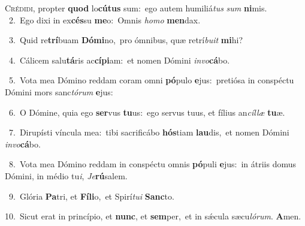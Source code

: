 \lettrine{\initial\textcolor{\initialcolor}{C}}{rédidi,} propter \textbf{quod} lo\-\textbf{cú}\-\textbf{tus} sum:~\star ego autem humiliá\textit{tus} \textit{sum} \textbf{ni}\-mis.\\
{\numbfont\textcolor{\numbcolor}{~2.}}~Ego dixi in ex\-\textbf{cés}\-su \textbf{me}\-o:~\star Omnis \textit{ho}\-\textit{mo} \textbf{men}\-dax.\par
{\numbfont\textcolor{\numbcolor}{~3.}}~Quid re\-\textbf{trí}\-buam \textbf{Dó}\-\textbf{mi}no,~\star pro ómnibus, quæ retrí\-\textit{bu}\-\textit{it} \textbf{mi}\-hi?\par
{\numbfont\textcolor{\numbcolor}{~4.}}~Cálicem salu\-\textbf{tá}\-ris ac\-\textbf{cí}\-\textbf{pi}am:~\star et nomen Dómini \textit{in}\-\textit{vo}\textbf{cá}bo.\par
{\numbfont\textcolor{\numbcolor}{~5.}}~Vota mea Dómino reddam coram omni \textbf{pó}\-pulo \textbf{e}\-jus:~\star pretiósa in conspéctu Dómini mors sanc\-\textit{tó}\-\textit{rum} \textbf{e}\-jus:\par
{\numbfont\textcolor{\numbcolor}{~6.}}~O Dómine, quia ego \textbf{ser}\-vus \textbf{tu}\-us:~\star ego servus tuus, et fílius an\-\textit{cíl}\-\textit{læ} \textbf{tu}\-æ.\par
{\numbfont\textcolor{\numbcolor}{~7.}}~Dirupísti víncula mea:~\dagger tibi sacrificábo \textbf{hós}\-tiam \textbf{lau}\-dis,~\star et nomen Dómini \textit{in}\-\textit{vo}\textbf{cá}bo.\par
{\numbfont\textcolor{\numbcolor}{~8.}}~Vota mea Dómino reddam in conspéctu omnis \textbf{pó}\-puli \textbf{e}\-jus:~\star in átriis domus Dómini, in médio tu\-\textit{i}\-, \textit{Je}\-\textbf{rú}salem.\par
{\numbfont\textcolor{\numbcolor}{~9.}}~Glória \textbf{Pa}\-tri, et \textbf{Fí}\-\textbf{li}o,~\star et Spirí\-\textit{tu}\-\textit{i} \textbf{Sanc}\-to.\par
{\numbfont\textcolor{\numbcolor}{10.}}~Sicut erat in princípio, et \textbf{nunc}\-, et \textbf{sem}\-per,~\star et in sǽcula sæcu\-\textit{ló}\-\textit{rum}. \textbf{A}\-men.\par
